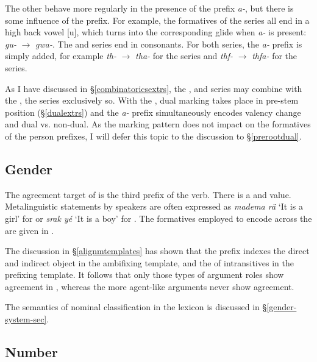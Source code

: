 The other  behave more regularly in the presence of the  prefix \emph{a-}, but there is some influence of the  prefix. For example, the formatives of the \Betatwo{} series all end in a high back vowel [u], which turns into the corresponding glide when \emph{a-} is present: \Ssg{} \emph{gu-} $\rightarrow$ \emph{gwa-}. The \Bet{} and \Betatwo{} series end in consonants. For both series, the \emph{a-} prefix is simply added, for example \Stnsg{} \emph{th-} $\rightarrow$ \emph{tha-} for the \Bet{} series and \Stnsg{} \emph{thf-} $\rightarrow$ \emph{thfa-} for the \Betatwo{} series.

As I have discussed in {\S}\ref{combinatoricsextrs}, the \Bet{}, \Betaone{} and \Gam{} series may combine with the , the \Gam{} series exclusively so. With the , dual marking takes place in pre-stem position ({\S}\ref{dualextrs}) and the \emph{a-} prefix simultaneously encodes valency change and dual vs. non-dual. As the marking pattern does not impact on the formatives of the person prefixes, I will defer this topic to the discussion to {\S}\ref{prerootdual}.

\subsection{Gender} \label{gender-subsec}

The agreement target of  is the third  prefix of the verb. There is a  and   value. Metalinguistic statements by speakers are often expressed as \emph{madema rä} `It is a girl' for  or \emph{srak yé} `It is a boy' for . The formatives employed to encode  across the  are given in .

The discussion in {\S}\ref{alignmtemplates} has shown that the prefix indexes the direct and indirect object in the ambifixing  template, and the  of intransitives in the prefixing template. It follows that only those types of argument roles show agreement in , whereas the more agent-like arguments never show  agreement.

The semantics of nominal  classification in the  lexicon is discussed in {\S}\ref{gender-system-sec}.

\subsection{Number} \label{number-subsec}

